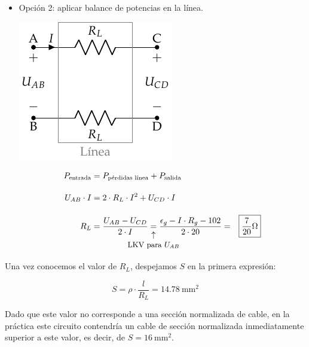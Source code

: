 \begin{example}
\begin{itemize}
  \item Opción 2: aplicar balance de potencias en la línea.

    \vspace{2mm}
    \begin{minipage}{0.4\linewidth}
      \begin{center}
        \includegraphics[scale=1]{../figs/linea_lkv.pdf}
      \end{center}
    \end{minipage}
    \begin{minipage}{0.6\linewidth}
      \begin{align*}
        P_{\textrm{entrada}} &= P_{\textrm{pérdidas línea}} + P_{\textrm{salida}}\\[10pt]
        U_{AB} \cdot I &= 2 \cdot R_L \cdot I^2 + U_{CD} \cdot I\\[10pt] 
        R_L &= \frac{U_{AB}-U_{CD}}{2 \cdot I} \underarrow[=][\uparrow]{\small LKV para \ensuremath{U_{AB}} } \frac{\epsilon_g - I\cdot R_g - 102}{2 \cdot 20} = \Aboxed{ {\frac{7}{20}}\si{\ohm} }
      \end{align*}
    \end{minipage}
  \end{itemize}

  Una vez conocemos el valor de $R_L$, despejamos $S$ en la primera
  expresión:

\[
  S = \rho \cdot \frac{l}{R_L} = \boxed{
    \qty{14.78}{\milli\meter\squared} }
\]

Dado que este valor no corresponde a una sección normalizada de cable,
en la práctica este circuito contendría un cable de sección
normalizada inmediatamente superior a este valor, es decir, de
$S = \qty{16}{\milli\meter\squared}$.


\end{example}
